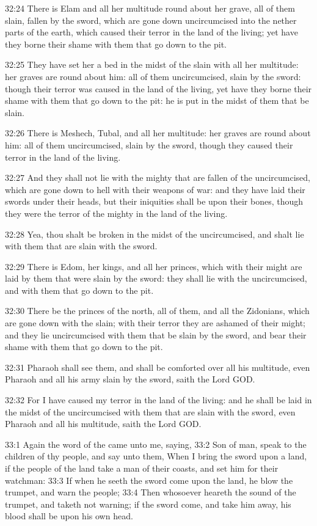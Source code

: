 32:24 There is Elam and all her multitude round about her grave, all of them slain, fallen by the sword, which are gone down uncircumcised into the nether parts of the earth, which caused their terror in the land of the living; yet have they borne their shame with them that go down to the pit.

32:25 They have set her a bed in the midst of the slain with all her multitude: her graves are round about him: all of them uncircumcised, slain by the sword: though their terror was caused in the land of the living, yet have they borne their shame with them that go down to the pit: he is put in the midst of them that be slain.

32:26 There is Meshech, Tubal, and all her multitude: her graves are round about him: all of them uncircumcised, slain by the sword, though they caused their terror in the land of the living.

32:27 And they shall not lie with the mighty that are fallen of the uncircumcised, which are gone down to hell with their weapons of war: and they have laid their swords under their heads, but their iniquities shall be upon their bones, though they were the terror of the mighty in the land of the living.

32:28 Yea, thou shalt be broken in the midst of the uncircumcised, and shalt lie with them that are slain with the sword.

32:29 There is Edom, her kings, and all her princes, which with their might are laid by them that were slain by the sword: they shall lie with the uncircumcised, and with them that go down to the pit.

32:30 There be the princes of the north, all of them, and all the Zidonians, which are gone down with the slain; with their terror they are ashamed of their might; and they lie uncircumcised with them that be slain by the sword, and bear their shame with them that go down to the pit.

32:31 Pharaoh shall see them, and shall be comforted over all his multitude, even Pharaoh and all his army slain by the sword, saith the Lord GOD.

32:32 For I have caused my terror in the land of the living: and he shall be laid in the midst of the uncircumcised with them that are slain with the sword, even Pharaoh and all his multitude, saith the Lord GOD.

33:1 Again the word of the \LORD came unto me, saying, 33:2 Son of man, speak to the children of thy people, and say unto them, When I bring the sword upon a land, if the people of the land take a man of their coasts, and set him for their watchman: 33:3 If when he seeth the sword come upon the land, he blow the trumpet, and warn the people; 33:4 Then whosoever heareth the sound of the trumpet, and taketh not warning; if the sword come, and take him away, his blood shall be upon his own head.

